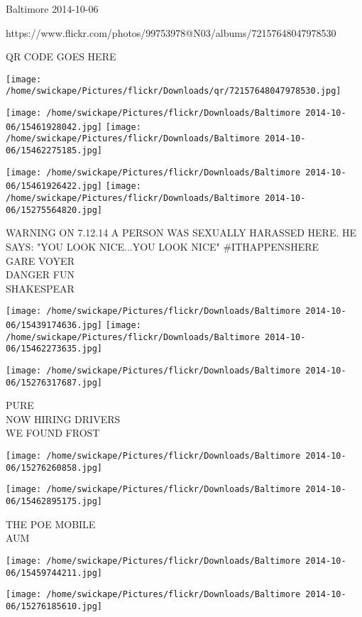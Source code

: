 \documentclass[10pt,letterpaper]{article}
\begin{document}
Baltimore 2014-10-06

https://www.flickr.com/photos/99753978@N03/albums/72157648047978530

QR CODE GOES HERE

\texttt{[image: /home/swickape/Pictures/flickr/Downloads/qr/72157648047978530.jpg]}
\pagebreak

\texttt{[image: /home/swickape/Pictures/flickr/Downloads/Baltimore 2014-10-06/15461928042.jpg]}
\texttt{[image: /home/swickape/Pictures/flickr/Downloads/Baltimore 2014-10-06/15462275185.jpg]}

\texttt{[image: /home/swickape/Pictures/flickr/Downloads/Baltimore 2014-10-06/15461926422.jpg]}
\texttt{[image: /home/swickape/Pictures/flickr/Downloads/Baltimore 2014-10-06/15275564820.jpg]}

WARNING ON 7.12.14 A PERSON WAS SEXUALLY HARASSED HERE.  HE SAYS: "YOU LOOK NICE...YOU LOOK NICE" \#ITHAPPENSHERE\\
GARE VOYER\\
DANGER FUN\\
SHAKESPEAR\\
\pagebreak

\texttt{[image: /home/swickape/Pictures/flickr/Downloads/Baltimore 2014-10-06/15439174636.jpg]}
\texttt{[image: /home/swickape/Pictures/flickr/Downloads/Baltimore 2014-10-06/15462273635.jpg]}

\texttt{[image: /home/swickape/Pictures/flickr/Downloads/Baltimore 2014-10-06/15276317687.jpg]}

PURE\\
NOW HIRING DRIVERS\\
WE FOUND FROST\\
\pagebreak

\texttt{[image: /home/swickape/Pictures/flickr/Downloads/Baltimore 2014-10-06/15276260858.jpg]}

\vspace{0.25in}
\texttt{[image: /home/swickape/Pictures/flickr/Downloads/Baltimore 2014-10-06/15462895175.jpg]}

THE POE MOBILE\\
AUM\\
\pagebreak

\texttt{[image: /home/swickape/Pictures/flickr/Downloads/Baltimore 2014-10-06/15459744211.jpg]}

\vspace{0.25in}
\texttt{[image: /home/swickape/Pictures/flickr/Downloads/Baltimore 2014-10-06/15276185610.jpg]}
\end{document}
